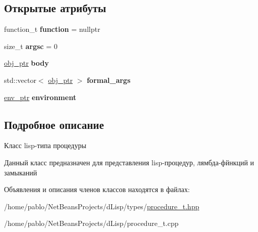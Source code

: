 \subsection*{Открытые атрибуты}
\begin{DoxyCompactItemize}
\item 
\mbox{\label{classprocedure__t_ae7b715b009091614021e87857ee497ad}} 
function\+\_\+t {\bfseries function} = nullptr
\item 
\mbox{\label{classprocedure__t_a190e43c93a40ba4f11710ac6798b3e6a}} 
size\+\_\+t {\bfseries argsc} = 0
\item 
\mbox{\label{classprocedure__t_a0a30d3e1ff7fbb68dbe9bbc0b5feefd9}} 
\mbox{\hyperlink{classmm__ptr}{obj\+\_\+ptr}} {\bfseries body}
\item 
\mbox{\label{classprocedure__t_a0deef5a236964908f85b3da0300271f0}} 
std\+::vector$<$ \mbox{\hyperlink{classmm__ptr}{obj\+\_\+ptr}} $>$ {\bfseries formal\+\_\+args}
\item 
\mbox{\label{classprocedure__t_ab3c92a016be4b0b8ae25d9c705bfa61c}} 
\mbox{\hyperlink{classmm__ptr}{env\+\_\+ptr}} {\bfseries environment}
\end{DoxyCompactItemize}


\subsection{Подробное описание}
Класс lisp-\/типа процедуры 

Данный класс предназначен для представления lisp-\/процедур, лямбда-\/фйнкций и замыканий 

Объявления и описания членов классов находятся в файлах\+:\begin{DoxyCompactItemize}
\item 
/home/pablo/\+Net\+Beans\+Projects/d\+Lisp/types/\mbox{\hyperlink{procedure__t_8hpp}{procedure\+\_\+t.\+hpp}}\item 
/home/pablo/\+Net\+Beans\+Projects/d\+Lisp/procedure\+\_\+t.\+cpp\end{DoxyCompactItemize}
